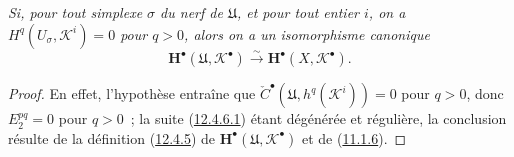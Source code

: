 \begin{corollary}[12.4.7]
\label{0.12.4.7-fr}
\emph{Si, pour tout simplexe $\sigma$ du nerf de $\mathfrak U$, et pour
tout entier $i$, on a
$H^q(U_\sigma,\mathcal K^i)=0$ pour $q>0$, alors on a un isomorphisme
canonique}
\begin{equation}
\label{0.12.4.7.1-fr}
\tag{12.4.7.1}
\mathbf H^\bullet(\mathfrak U,\mathcal K^\bullet)
\xrightarrow{\sim}\mathbf H^\bullet(X,\mathcal K^\bullet).
\end{equation}
\end{corollary}

\begin{proof}
En effet, l'hypothèse entraîne que
$\check C^\bullet(\mathfrak U,h^q(\mathcal K^i))=0$ pour $q>0$, donc
$E_2^{pq}=0$ pour $q>0$~; la suite
(\hyperref[0.12.4.6.1-fr]{12.4.6.1}) étant dégénérée et régulière, la
conclusion résulte de la définition
(\hyperref[0.12.4.5-fr]{12.4.5}) de
$\mathbf H^\bullet(\mathfrak U,\mathcal K^\bullet)$ et de
(\hyperref[0.11.1.6-fr]{11.1.6}).
\end{proof}

